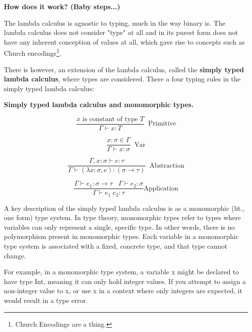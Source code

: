 \documentclass{l4proj}
\begin{document}
\textbf{How does it work? (Baby steps...)}

The lambda calculus is agnostic to typing, much in the way binary is.
The lambda calculus does not consider "type" at all and in its purest form does not have any inherent conception of values at all, which gave rise to concepts such as Church encodings\footnote{Church Encodings are a thing.}. 

There is however, an extension of the lambda calculus, called the \textbf{simply typed lambda calculus}, where types are considered.
There a four typing rules in the simply typed lambda calculus:

\textbf{Simply typed lambda calculus and monomorphic types.}

\begin{equation} \label{eq:stlc-primitives-rule}
    \frac{x\text{ is constant of type }T}{\Gamma \vdash x:T} \;\;\text{Primitive}
\end{equation}

\begin{equation} \label{eq:stlc-var-rule}
    \frac{x:\sigma \in \Gamma}{\Gamma \vdash x:\sigma} \;\;\text{Var}
\end{equation}

\begin{equation} \label{eq:stlc-abstraction}
    \frac{\Gamma, x:\sigma \vdash e:\tau}{\Gamma \vdash (\lambda x:\sigma, e): (\sigma \rightarrow \tau)} \;\;\text{Abstraction}
\end{equation}

\begin{equation} \label{eq:stlc-application}
    \frac{\Gamma \vdash e_1:\sigma\rightarrow\tau \;\;\; \Gamma \vdash e_2:\sigma}{\Gamma \vdash e_1 \; e_2:\tau} \text{Application}
\end{equation}

A key description of the simply typed lambda calculus is as a monomorphic (lit., one form) type system.
In type theory, monomorphic types refer to types where variables can only represent a single, specific type.
In other words, there is no polymorphism present in monomorphic types. Each variable in a monomorphic type system is associated with a fixed, concrete type, and that type cannot change.

For example, in a monomorphic type system, a variable x might be declared to have type Int, meaning it can only hold integer values.
If you attempt to assign a non-integer value to x, or use x in a context where only integers are expected, it would result in a type error.
\end{document}
